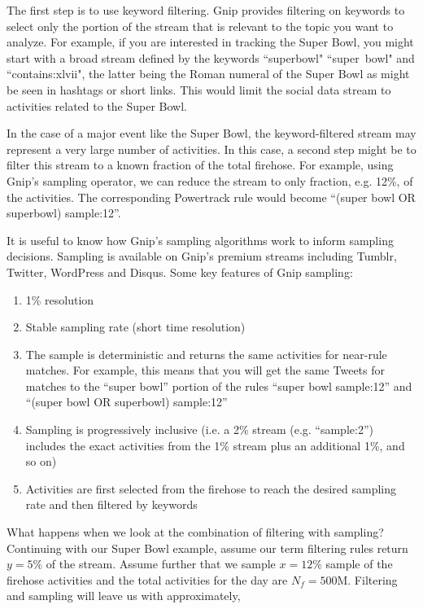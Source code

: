 \documentclass{article}
\begin{document}
The first step is to use keyword filtering.  Gnip provides filtering on keywords to select only the portion of the stream
that is relevant to the topic you want to analyze. For example, if you are interested in tracking the Super Bowl, you 
might start with a broad stream defined by the keywords ``superbowl" ``super~bowl" and ``contains:xlvii", the 
latter being the Roman numeral of the Super Bowl as might be seen in hashtags or short links. This would limit the 
social data stream to activities related to the Super Bowl.

In the case of a major event like the Super Bowl, the keyword-filtered stream may represent a very large number
of activities.  In this case, a second step might be to filter this stream to a known fraction of the total firehose. For 
example, using Gnip's sampling operator, we can reduce the stream to only fraction, e.g. 12\%, of the activities. 
The corresponding Powertrack rule would become  ``(super bowl OR superbowl) sample:12''.

It is useful to know how Gnip's sampling algorithms work to inform sampling decisions.  Sampling is available on
Gnip's premium streams including Tumblr, Twitter, WordPress and Disqus. Some key features of Gnip sampling:

\begin{enumerate}
	\item 1\% resolution
	\item Stable sampling rate (short time resolution)
	\item The sample is deterministic and returns the same activities for near-rule matches.  For example, this means
	that you will get the same Tweets for matches to the ``super bowl'' portion of the rules ``super bowl sample:12'' 
	and ``(super bowl OR superbowl) sample:12''
	\item Sampling is progressively inclusive (i.e. a 2\% stream (e.g. ``sample:2'') includes the exact activities from
	the 1\% stream plus an 
	additional 1\%,  and so on)
	\item Activities are first selected from the firehose to reach the desired sampling rate and then filtered by keywords 
\end{enumerate}

What happens when we look at the combination of filtering with sampling?  Continuing with our Super Bowl example, 
assume our term filtering rules return $y=5\%$ of the stream. Assume further that we sample $x=12\%$ sample of 
the firehose activities and the total activities for the day are $N_f=500$M. Filtering and sampling will leave us with 
approximately,
\end{document}

